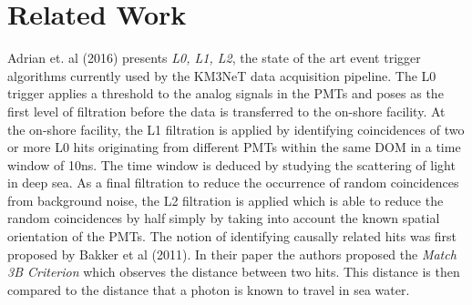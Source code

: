 \chapter{Related Work}
\label{cha:related-work}

Adrian et. al (2016) presents \emph{L0, L1, L2}, the state of the art
event trigger algorithms currently used by the KM3NeT data acquisition
pipeline. The L0 trigger applies a threshold to the analog signals in
the PMTs and poses as the first level of filtration before the data is
transferred to the on-shore facility. At the on-shore facility, the L1
filtration is applied by identifying coincidences of two or more L0
hits originating from different PMTs within the same DOM in a time
window of 10ns. The time window is deduced by studying the scattering
of light in deep sea. As a final filtration to reduce the occurrence
of random coincidences from background noise, the L2 filtration is
applied which is able to reduce the random coincidences by half simply
by taking into account the known spatial orientation of the PMTs. The
notion of identifying causally related hits was first proposed by
Bakker et al (2011). In their paper the authors proposed the
\emph{Match 3B Criterion} which observes the distance between two
hits. This distance is then compared to the distance that a photon is
known to travel in sea water.


